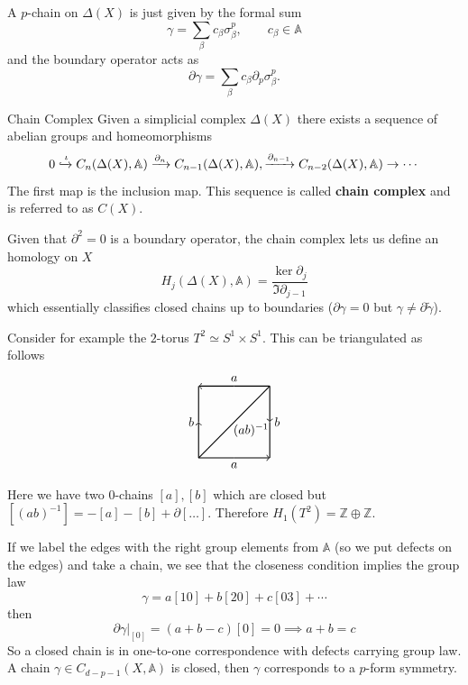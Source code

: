 \documentclass[11pt]{article}
\theoremstyle{definition}
\numberwithin{equation}{section}
\newcommand*\bbA{\mathbb{A}}
\newcommand*\bbZ{\mathbb{Z}}
\begin{document}
A $p$-chain on $\Delta(X)$ is just given by the formal sum
\begin{equation}
	 \gamma=\sum_{\beta}c_{\beta}\sigma^{p}_{\beta},\qquad c_{\beta}\in\bbA
\end{equation}
and the boundary operator acts as
\begin{equation}
	\partial \gamma=\sum_{\beta}c_{\beta}\partial_{p}\sigma_{\beta}^{p}.
\end{equation}
\begin{defn}{Chain Complex}{}
	Given a simplicial complex $\Delta(X)$ there exists a sequence of abelian groups and homeomorphisms
	\begin{equation}
		0\xhookrightarrow{\iota} C_{n}(\Delta(X),\bbA)\xrightarrow{\partial_{n}} C_{n-1}(\Delta(X),\bbA),\xrightarrow{\partial_{n-1}}C_{n-2}(\Delta(X),\bbA)\rightarrow\cdots
	\end{equation}
	The first map is the inclusion map. This sequence is called \textbf{chain complex} and is referred to as $C(X)$.
\end{defn}
Given that $\partial^{2}=0$ is a boundary operator, the chain complex lets us define an homology on $X$
\begin{equation}
	H_{j}(\Delta(X),\bbA)=\frac{\ker \partial_{j}}{\Im \partial_{j-1}}
\end{equation}
which essentially classifies closed chains up to boundaries ($\partial\gamma=0$ but $\gamma\neq\partial\tilde\gamma$).

Consider for example the $2$-torus $T^{2}\simeq S^{1}\times S^{1}$. This can be triangulated as follows
\begin{equation}
\begin{tikzpicture}[thick]
  \draw[->](0,0)--(0,1) node[anchor=east] {$b$};
  \draw[-](0,1)--(0,2);
  \draw[<-](0,2)--(1,2) node[anchor=south] {$a$};
  \draw[-](1,2)--(2,2);
  \draw[->](2,2)--(2,1)node[anchor=west] {$b$};
  \draw[-](2,1)--(2,0);
  \draw[<-](2,0)--(1,0) node[anchor=north] {$a$};
  \draw[-](1,0)--(0,0);
  \draw[-](0,0)--(2,2) node[yshift=-35, xshift=-15] {$\tiny (ab)^{-1}$};
\end{tikzpicture}
\end{equation}
Here we have two $0$-chains $[a],[b]$ which are closed but $[(ab)^{-1}]=-[a]-[b]+\partial[\ldots]$. Therefore $H_{1}(T^{2})=\bbZ\oplus\bbZ$.

If we label the edges with the right group elements from $\bbA$ (so we put defects on the edges) and take a chain, we see that the closeness condition implies the group law
\begin{equation}
	\gamma=a[10]+b[20]+c[03]+\cdots
\end{equation}
then
\begin{equation}
	\left.\partial\gamma\right|_{[0]}=(a+b-c)[0]=0\implies a+b=c
\end{equation}
So a closed chain is in one-to-one correspondence with defects carrying group law. A chain $\gamma\in C_{d-p-1}(X,\bbA)$ is closed, then $\gamma$ corresponds to a $p$-form symmetry.
\end{document}
